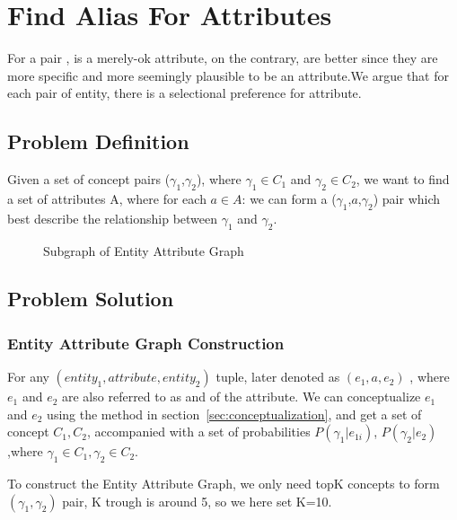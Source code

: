 
\section{Find Alias For Attributes}

For a pair ,  is a merely-ok attribute, on the contrary,  are better since they are more specific and more seemingly plausible to be an attribute.We argue that for each pair of entity, there is a selectional preference for attribute.

\subsection{Problem Definition}
Given a set of concept pairs ($\gamma_1$,$\gamma_2$), where $\gamma_1\in C_1$ and $\gamma_2\in C_2$, we want to find a set of attributes A, where for each $a \in A$:
we can form a ($\gamma_1$,$a$,$\gamma_2$) pair which best describe the relationship between $\gamma_1$ and $\gamma_2$.


\begin{figure}[!htb]
\centering {}
\caption{Subgraph of Entity Attribute Graph } \label{fig:eag}
\end{figure}


\subsection{Problem Solution}

\subsubsection{Entity Attribute Graph Construction}

For any $(entity_1, attribute, entity_2)$ tuple, later denoted as  $(e_1, a, e_2)$ , where $e_1$ and $e_2$ are also referred to as  and  of the attribute. We can conceptualize $e_1$ and $e_2$ using the method in section~\ref{sec:conceptualization}, and get a set of concept $C_1,C_2$, accompanied with a set of probabilities $P(\gamma_{1}|e_{1i})$, $P(\gamma_{2}|e_2)$,where ${\gamma_{1} \in C_1},{\gamma_{2} \in C_2}$.

To construct the Entity Attribute Graph, we only need topK concepts to form $(\gamma_1,\gamma_2)$ pair, K trough  is around 5, so we here set K=10.

